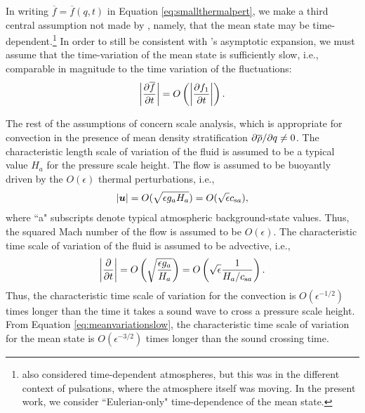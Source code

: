 \documentclass[12pt]{article}
\newcommand{\csa}{c_{{\rm s}a}}
\begin{document}
	In writing $\overline{f}=\overline{f}(q,t)$ in Equation \eqref{eq:smallthermalpert}, we make a third central assumption not made by \citet{Gough1969}, namely, that the mean state may be time-dependent.\footnote{\citet{Gough1969} also considered time-dependent atmospheres, but this was in the different context of pulsations, where the atmosphere itself was moving. In the present work, we consider ``Eulerian-only" time-dependence of the mean state.} In order to still be consistent with \citet{Gough1969}'s asymptotic expansion, we must assume that the time-variation of the mean state is sufficiently slow, i.e., comparable in magnitude to the time variation of the fluctuations:
\begin{align}\label{eq:meanvariationslow}
	\left|\frac{\partial\overline{f}}{\partial t}\right| = O\left(\left|\frac{\partial f_1}{\partial t}\right|\right).
\end{align}

	The rest of the assumptions of \citet{Gough1969} concern scale analysis, which is appropriate for convection in the presence of mean density stratification $\partial\overline{\rho}/\partial q\neq0$. The characteristic length scale of variation of the fluid is assumed to be a typical value $H_a$ for the pressure scale height. The flow is assumed to be buoyantly driven by the $O(\epsilon)$ thermal perturbations, i.e., 
	\begin{align}\label{eq:scaleu}
		|\vecu| = O(\sqrt{\epsilon g_a H_a}) = O(\sqrt{\epsilon}\csa),
	\end{align}
	where ``a" subscripts denote typical atmospheric background-state values. Thus, the squared Mach number of the flow is assumed to be $O(\epsilon)$. The characteristic time scale of variation of the fluid is assumed to be advective, i.e., 
	\begin{align}\label{eq:scaleu}
	\left|\pderiv{}{t}\right|  = O\left(\sqrt{\frac{\epsilon g_a}{H_a}}\right) = O\left(\sqrt{\epsilon} \frac{1}{H_a/\csa}\right).
	\end{align}
	Thus, the characteristic time scale of variation for the convection is $O(\epsilon^{-1/2})$ times longer than the time it takes a sound wave to cross a pressure scale height. From Equation \eqref{eq:meanvariationslow}, the characteristic time scale of variation for the mean state is $O(\epsilon^{-3/2})$ times longer than the sound crossing time. 
	
\end{document}
